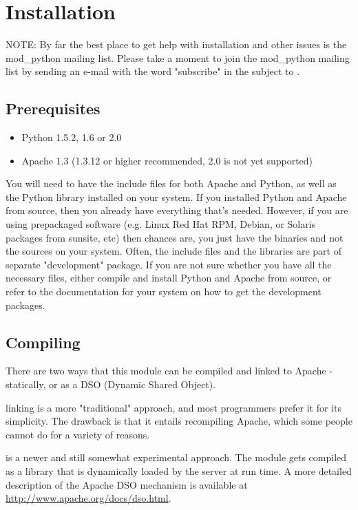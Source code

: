 \chapter{Installation\label{installation}}
NOTE: By far the best place to get help with installation and other
issues is the mod_python mailing list. Please take a moment to join
the mod_python mailing list by sending an e-mail with the word
"subscribe" in the subject to .

\section{Prerequisites\label{inst-prerequisites}}

\begin{itemize}
\item
Python 1.5.2, 1.6 or 2.0
\item
Apache 1.3 (1.3.12 or higher recommended, 2.0 is not yet supported) 
\end{itemize}

You will need to have the include files for both Apache and Python, as
well as the Python library installed on your system.  If you installed
Python and Apache from source, then you already have everything that's
needed. However, if you are using prepackaged software (e.g. Linux Red
Hat RPM, Debian, or Solaris packages from sunsite, etc) then chances
are, you just have the binaries and not the sources on your
system. Often, the include files and the libraries are part of
separate "development" package. If you are not sure whether you have
all the necessary files, either compile and install Python and Apache
from source, or refer to the documentation for your system on how to
get the development packages.

\section{Compiling\label{inst-compiling}}

There are two ways that this module can be compiled and linked to
Apache - statically, or as a DSO (Dynamic Shared Object).

 linking is a more "traditional" approach, and most programmers
prefer it for its simplicity. The drawback is that it entails
recompiling Apache, which some people cannot do for a variety of
reasons. 

 is a newer and still somewhat experimental
approach. The module gets compiled as a library that is dynamically
loaded by the server at run time. A more detailed description of the
Apache DSO mechanism is available at
\url{http://www.apache.org/docs/dso.html}.

